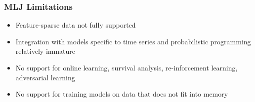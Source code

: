 \documentclass[t]{beamer}
\newcommand\df{\bf\color{Maroon}}
\begin{document}
\begin{frame}
  \frametitle{MLJ Limitations}
     \begin{itemize}
     \item Feature-sparse data not fully supported
     \item Integration with models specific to time series and probabilistic programming
        relatively immature
     \item No support for online learning, survival analysis,
       re-inforcement learning, adversarial learning
     \item No support for training models on data that does not fit into memory
     \end{itemize}
\end{frame}







\end{document}
